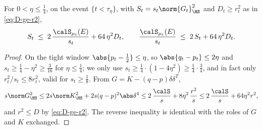 \documentclass[../../main.tex]{subfiles}
\begin{document}
\begin{lemma}
\label{lem:stein-vs-source}
For $0<\eta\le\tfrac14$, on the event $\{t<\tau_\eta\}$, with
$S_t=s_t\norm{G_t}_\HS^2$ and $D_t\ge r_t^2$ as in
\eqref{eq:D-ge-r2},
\begin{equation}\label{eq:conversion}
  S_t\;\le\;2\,\frac{\calS_{\mu_t}(E)}{s_t}+64\,\eta^2 D_t,
  \qquad
  \frac{\calS_{\mu_t}(E)}{s_t}\;\le\;2\,S_t+64\,\eta^2 D_t .
\end{equation}
\end{lemma}

\begin{proof}
On the tight window $\abs{p_t-\tfrac12}\le\eta$, so $\abs{q_t-p_t}\le2\eta$ and
$s_t\ge\tfrac14-\eta^2\ge\tfrac3{16}$ for $\eta\le\tfrac14$; we only use $s_t\ge\tfrac14\cdot
(1-4\eta^2)\ge\tfrac1{4}\cdot\tfrac34$, and in fact only $r_t^2/s_t\le 8r_t^2$, valid for
$s_t\ge\tfrac18$. From $G=K-(q-p)\delta\delta^T$,
\[
  s\norm G_\HS^2\le2s\norm K_\HS^2+2s(q-p)^2\abs\delta^4
  \le2\,\frac{\calS}{s}+8\eta^2\,\frac{r^2}{s}
  \le2\,\frac{\calS}{s}+64\eta^2r^2 ,
\]
and $r^2\le D$ by \eqref{eq:D-ge-r2}. The reverse inequality is identical with the roles of $G$
and $K$ exchanged.
\end{proof}
\end{document}
